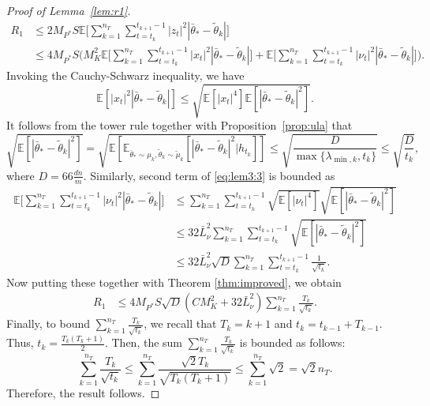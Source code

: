 \documentclass[11pt]{article}
\theoremstyle{plain}
\theoremstyle{definition}
\theoremstyle{remark}
\begin{document}
\begin{proof}[Proof of Lemma~\ref{lem:r1}]
\begin{equation}
\begin{split}
R_1&\leq 2 M_{P^*} S  \mathbb{E} \bigg [
 \sum_{k=1}^{n_T} \sum_{t=t_k}^{t_{k+1} -1} |z_t|^2|\bar{\theta}_* - \tilde{\theta}_k|
\bigg ] \\
&\leq 4 M_{P^*} S\bigg( M_K^2 \mathbb{E} \bigg [
 \sum_{k=1}^{n_T} \sum_{t=t_k}^{t_{k+1} -1} |x_t|^2|\bar{\theta}_* - \tilde{\theta}_k|
\bigg ] +   \mathbb{E} \bigg [
 \sum_{k=1}^{n_T} \sum_{t=t_k}^{t_{k+1} -1} |\nu_t|^2|\bar{\theta}_* - \tilde{\theta}_k|
\bigg ]\bigg).
\end{split}
\end{equation}
Invoking the Cauchy-Schwarz inequality, we have
\[
\mathbb{E} [|x_t|^2 |\bar{\theta}_* - \tilde{\theta}_k| ]
\leq \sqrt{\mathbb{E}[|x_t|^4] \mathbb{E}[|\bar{\theta}_* - \tilde{\theta}_k|^2 ]}.
\]
It follows from the tower rule together with Proposition~\ref{prop:ula} that
\[
\sqrt{\mathbb{E}[|\bar{\theta}_* - \tilde{\theta}_k|^2 ]}
= \sqrt{ \mathbb{E} [\mathbb{E}_{\bar\theta_* \sim \mu_k, \tilde{\theta}_k \sim \tilde{\mu}_k} [|\bar{\theta}_* - \tilde{\theta}_k|^2  | h_{t_k}]] } \leq \sqrt{\frac{D}{\max\{\lambda_{\min,k},t_k\}}}
\leq \sqrt{\frac{D}{t_{k}}},
\]
where $D = 66\frac{dn}{m}$.
Similarly, second term of \eqref{eq:lem3:3} is bounded as
\begin{equation}\nonumber
\begin{split}
\mathbb{E} \bigg [
 \sum_{k=1}^{n_T} \sum_{t=t_k}^{t_{k+1} -1} |\nu_t|^2|\bar{\theta}_* - \tilde{\theta}_k|
\bigg ]
&\leq \sum_{k=1}^{n_T} \sum_{t=t_k}^{t_{k+1} -1} \sqrt{\mathbb{E}[|\nu_t|^4]} \sqrt{\mathbb{E}[|\bar{\theta}_* - \tilde{\theta}_k|^2 ]}\\
&\leq 32\bar{L}_{\nu}^2\sum_{k=1}^{n_T} \sum_{t=t_k}^{t_{k+1} -1}\sqrt{\mathbb{E}[|\bar{\theta}_* - \tilde{\theta}_k|^2 ]}\\
&\leq 32\bar{L}_{\nu}^2\sqrt{D}\sum_{k=1}^{n_T} \sum_{t=t_k}^{t_{k+1} -1}\frac{1}{\sqrt{t_k}}.
\end{split}    
\end{equation}
Now putting these together with Theorem \ref{thm:improved}, we obtain
\begin{equation}
\begin{split}
R_1&\leq 4M_{P^*} S\sqrt{D}(C M_K^2+32\bar{L}_{\nu}^2) \sum_{k=1}^{n_T} \frac{T_k}{\sqrt{t_k}}.
\end{split}
\end{equation}
Finally, to bound $\sum_{k=1}^{n_T} \frac{T_k}{\sqrt{t_k}}$, we recall that 
$T_k = k+1$ and $t_k = t_{k-1} + T_{k-1}$. 
Thus, $t_k = \frac{T_k(T_k+1)}{2}$.
Then, the sum $\sum_{k=1}^{n_T} \frac{T_k}{\sqrt{t_k}}$ is bounded as follows:
\begin{equation}\label{eq:lem1:t}
    \sum_{k=1}^{n_T} \frac{T_k}{\sqrt{t_k}} \leq \sum_{k=1}^{n_T} \frac{\sqrt{2}T_k}{\sqrt{T_k(T_k+1)}}\leq \sum_{k=1}^{n_T} \sqrt{2}= \sqrt{2}n_T.
\end{equation}
Therefore, the result follows. 
\end{proof}
\end{document}

